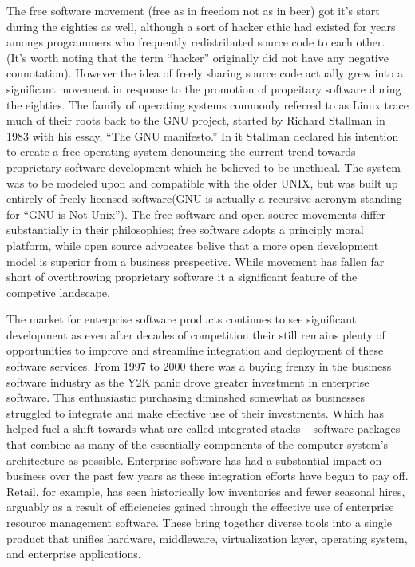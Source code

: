 The free software movement (free as in freedom not as in beer) got it's start during the eighties as well, although a sort of hacker ethic had existed for years amongs programmers who frequently redistributed source code to each other.
(It's worth noting that the term ``hacker'' originally did not have any negative connotation).
However the idea of freely sharing source code actually grew into a significant movement in response to the promotion of propeitary software during the eighties.  
The family of operating systems commonly referred to as Linux trace much of their roots back to the GNU project, started by Richard Stallman in 1983 with his essay, ``The GNU manifesto.''\autocite[]{GNUManifesto}
In it Stallman declared his intention to create a free operating system denouncing the current trend towards proprietary software development which he believed to be unethical.\autocite[]{GNUManifesto}
The system was to be modeled upon and compatible with the older UNIX, but was built up entirely of freely licensed software(GNU is actually a recursive acronym standing for ``GNU is Not Unix'').\autocite[]{GNUManifesto}
The free software and open source movements differ substantially in their philosophies; free software adopts a principly moral platform, while open source advocates belive that a more open development model is superior from a business prespective.
While movement has fallen far short of overthrowing proprietary software it a significant feature of the competive landscape.

The market for enterprise software products continues to see significant development as even after decades of competition their still remains plenty of opportunities to improve and streamline integration and deployment of these software services.
From 1997 to 2000 there was a buying frenzy in the business software industry as the Y2K panic drove greater investment in enterprise software.\autocite[]{AftermathOfIntegratedStack}
This enthusiastic purchasing diminshed somewhat as businesses struggled to integrate and make effective use of their investments.\autocite[]{AftermathOfIntegratedStack}
Which has helped fuel a shift towards what are called integrated stacks -- software packages that combine as many of the essentially components of the computer system's architecture as possible.
Enterprise software has had a substantial impact on business over the past few years as these integration efforts have begun to pay off.
Retail, for example, has seen historically low inventories and fewer seasonal hires, arguably as a result of efficiencies gained through the effective use of enterprise resource management software. \autocite[]{AftermathOfIntegratedStack}
These bring together diverse tools into a single product that unifies hardware, middleware, virtualization layer, operating system, and enterprise applications.\autocite[]{AftermathOfIntegratedStack}

